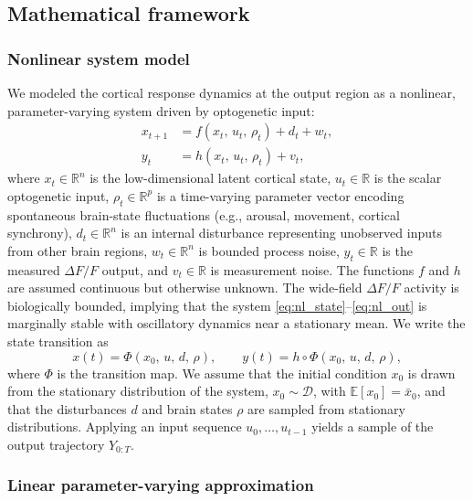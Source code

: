 \subsection*{Mathematical framework}

\subsubsection*{Nonlinear system model}

We modeled the cortical response dynamics at the output region as a
nonlinear, parameter-varying system driven by optogenetic input:
%
\begin{align}
    x_{t+1} &= f(x_{t},\,u_{t},\,\rho_{t}) + d_{t} + w_{t},
               \label{eq:nl_state} \\
    y_{t}   &= h(x_{t},\,u_{t},\,\rho_{t}) + v_{t},
               \label{eq:nl_out}
\end{align}
%
where $x_{t} \in \mathbb{R}^{n}$ is the low-dimensional latent cortical
state, $u_{t} \in \mathbb{R}$ is the scalar optogenetic input,
$\rho_{t} \in \mathbb{R}^{p}$ is a time-varying parameter vector
encoding spontaneous brain-state fluctuations (e.g., arousal, movement,
cortical synchrony), $d_{t} \in \mathbb{R}^{n}$ is an internal
disturbance representing unobserved inputs from other brain regions,
$w_{t} \in \mathbb{R}^{n}$ is bounded process noise, $y_{t} \in
\mathbb{R}$ is the measured $\Delta F/F$ output, and $v_{t} \in
\mathbb{R}$ is measurement noise. The functions $f$ and $h$ are assumed
continuous but otherwise unknown. The wide-field $\Delta F/F$ activity
is biologically bounded, implying that the system
\eqref{eq:nl_state}--\eqref{eq:nl_out} is marginally stable with
oscillatory dynamics near a stationary mean. We write the state
transition as
%
\begin{equation*}
    x(t) = \Phi(x_{0},\,u,\,d,\,\rho), \qquad
    y(t) = h \circ \Phi(x_{0},\,u,\,d,\,\rho),
\end{equation*}
%
where $\Phi$ is the transition map. We assume that the initial condition
$x_{0}$ is drawn from the stationary distribution of the system,
$x_{0} \sim \mathcal{D}$, with $\mathbb{E}[x_{0}] = \bar{x}_{0}$, and
that the disturbances $d$ and brain states $\rho$ are sampled from
stationary distributions. Applying an input sequence $u_{0}, \ldots,
u_{t-1}$ yields a sample of the output trajectory $Y_{0:T}$.

\subsubsection*{Linear parameter-varying approximation}

